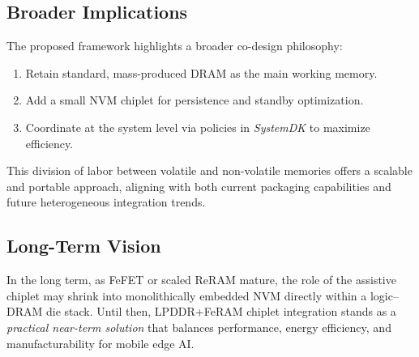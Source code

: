 \subsection{Broader Implications}
The proposed framework highlights a broader co-design philosophy:
\begin{enumerate}
  \item Retain standard, mass-produced DRAM as the main working memory.
  \item Add a small NVM chiplet for persistence and standby optimization.
  \item Coordinate at the system level via policies in \emph{SystemDK} to maximize efficiency.
\end{enumerate}
This division of labor between volatile and non-volatile memories offers a scalable and portable approach, aligning with both current packaging capabilities and future heterogeneous integration trends.

\subsection{Long-Term Vision}
In the long term, as FeFET or scaled ReRAM mature, the role of the assistive chiplet may shrink into monolithically embedded NVM directly within a logic--DRAM die stack. 
Until then, LPDDR+FeRAM chiplet integration stands as a \emph{practical near-term solution} that balances performance, energy efficiency, and manufacturability for mobile edge AI.
